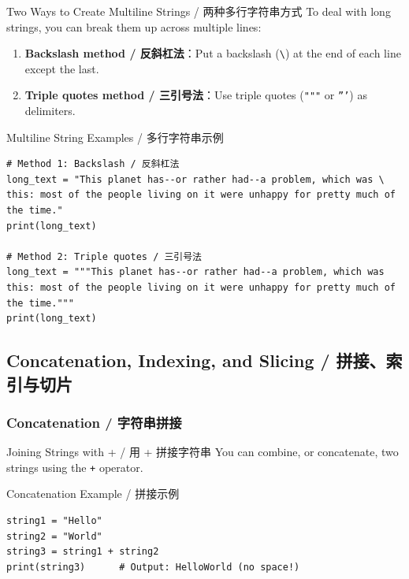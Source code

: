 \documentclass[11pt,a4paper]{article}
\begin{document}
\begin{concept}{Two Ways to Create Multiline Strings / 两种多行字符串方式}
    To deal with long strings, you can break them up across multiple lines:
    \begin{enumerate}[itemsep=0.3em]
        \item \textbf{Backslash method / 反斜杠法}：Put a backslash (\texttt{\textbackslash}) at the end of each line except the last.
        \item \textbf{Triple quotes method / 三引号法}：Use triple quotes (\texttt{"""} or \texttt{'''}) as delimiters.
    \end{enumerate}
\end{concept}

\begin{examplebox}{Multiline String Examples / 多行字符串示例}
\begin{lstlisting}
# Method 1: Backslash / 反斜杠法
long_text = "This planet has--or rather had--a problem, which was \
this: most of the people living on it were unhappy for pretty much of the time."
print(long_text)

# Method 2: Triple quotes / 三引号法
long_text = """This planet has--or rather had--a problem, which was
this: most of the people living on it were unhappy for pretty much of the time."""
print(long_text)
\end{lstlisting}
\end{examplebox}

\subsection{Concatenation, Indexing, and Slicing / 拼接、索引与切片}

\subsubsection{Concatenation / 字符串拼接}
\begin{concept}{Joining Strings with + / 用 + 拼接字符串}
    You can combine, or concatenate, two strings using the \texttt{+} operator.
\end{concept}

\begin{examplebox}{Concatenation Example / 拼接示例}
\begin{lstlisting}
string1 = "Hello"
string2 = "World"
string3 = string1 + string2
print(string3)      # Output: HelloWorld (no space!)
\end{lstlisting}
\end{examplebox}
\end{document}
